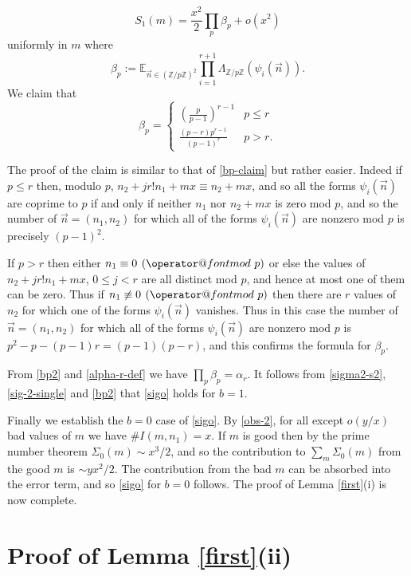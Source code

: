 \documentclass[12pt]{amsart}
\makeatletter
\numberwithin{equation}{section}  %
\theoremstyle{remark}
\theoremstyle{plain}
\numberwithin{equation}{section}
\newcommand{\Z}{\mathbb{Z}}
\newcommand{\E}{\mathbb{E}}  %
\renewcommand{\pmod}[1]{\allowbreak\mkern7mu({\operator@font mod}\,\,#1)}
\renewcommand{\leq}{\leqslant}
\renewcommand{\(}{\left(}
\renewcommand{\)}{\right)}
\newcommand{\asym}{\sim}   %
\newcommand{\vect}[1]{{\ensuremath{\vec{#1}}}}
\makeatother
\begin{document}
\begin{equation}\label{sig-2-single} S_1(m) = \frac{x^2}{2} \prod_p \beta_p + o(x^2)\end{equation} uniformly in $m$
where
\[ \beta_p := \E_{\vect{n} \in (\Z/p\Z)^2} \prod_{i = 1}^{r+1} \Lambda_{\Z/p\Z} (\psi_i(\vect{n})).\]
We claim that
\begin{equation}\label{bp2} \beta_p = \left\{ \begin{array}{ll} (\frac{p}{p-1})^{r-1} & p \leq r \\ \frac{(p-r)p^{r-1}}{(p-1)^r} & p > r.\end{array}  \right. \end{equation}

The proof of the claim is similar to that of \eqref{bp-claim} but rather easier. Indeed if $p \leq r$ then, modulo $p$, $n_2 + jr! n_1 + mx \equiv n_2 + mx$, and so all the forms $\psi_i(\vect{n})$ are coprime to $p$ if and only if neither $n_1$ nor $n_2 +
 mx$ is zero mod $p$, and so the number of $\vect{n} = (n_1, n_2)$ for which all of the forms $\psi_i(\vect{n})$ are nonzero mod $p$ is precisely $(p-1)^2$.

If $p > r$ then either $n_1 \equiv 0 \pmod{p}$ or else the values of $n_2 + jr! n_1 + mx$, $0 \leq j < r$ are all distinct mod $p$, and hence at most one of them can be zero. Thus if $n_1 \not\equiv 0 \pmod{p}$ then there are $r$ values of $n_2$ for which one
 of the forms $\psi_i(\vect{n})$ vanishes. Thus in this case the number of $\vect{n} = (n_1, n_2)$ for which all of the forms $\psi_i(\vect{n})$ are nonzero mod $p$ is $p^2 - p - (p-1)r = (p-1)(p-r)$, and this confirms the formula for $\beta_p$.

From \eqref{bp2} and \eqref{alpha-r-def} we have $\prod_p \beta_p =
\alpha_r$. It follows from \eqref{sigma2-s2}, \eqref{sig-2-single}
and \eqref{bp2} that \eqref{sigo} holds for $b=1$.

Finally we establish the $b=0$ case of \eqref{sigo}. By \eqref{obs-2}, for all except $o(y/x)$ bad values of $m$ we have $\# I(m,n_1) = x$. If $m$ is good then by the prime number theorem $\Sigma_0(m) \asym x^3/2$, and so the contribution to
$\sum_m \Sigma_0(m)$ from the good $m$ is $\asym yx^2/2$. The contribution from the bad $m$ can be absorbed into the error term, and so \eqref{sigo} for $b=0$ follows.  The proof of Lemma \ref{first}(i) is now complete.

\section{Proof of Lemma \ref{first}(ii)}\label{second-lemma-sec}
\end{document}
